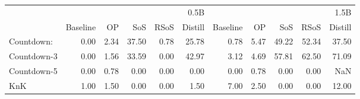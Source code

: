 \begin{tabular}{lrrrrrrrrrr}
\toprule
 & \multicolumn{5}{r}{0.5B} & \multicolumn{5}{r}{1.5B} \\
 & Baseline & OP & SoS & RSoS & Distill & Baseline & OP & SoS & RSoS & Distill \\
\midrule
Countdown: & 0.00 & 2.34 & 37.50 & 0.78 & 25.78 & 0.78 & 5.47 & 49.22 & 52.34 & 37.50 \\
Countdown-3 & 0.00 & 1.56 & 33.59 & 0.00 & 42.97 & 3.12 & 4.69 & 57.81 & 62.50 & 71.09 \\
Countdown-5 & 0.00 & 0.78 & 0.00 & 0.00 & 0.00 & 0.00 & 0.78 & 0.00 & 0.00 & NaN \\
KnK & 1.00 & 1.50 & 0.00 & 0.00 & 1.50 & 7.00 & 2.50 & 0.00 & 0.00 & 12.00 \\
\bottomrule
\end{tabular}
